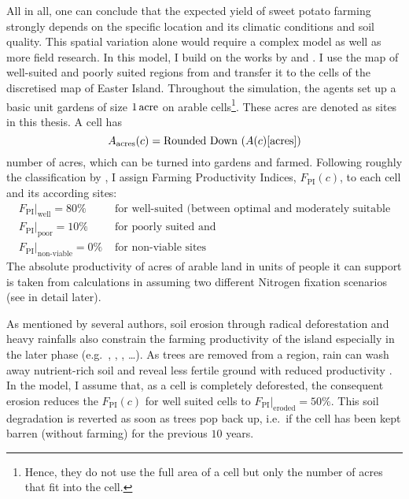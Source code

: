 All in all, one can conclude that the expected yield of sweet potato farming strongly depends on the specific location and its climatic conditions and soil quality.
This spatial variation alone would require a complex model as well as more field research.
In this model, I build on the works by \citep{Puleston2017} and \citet{Louwagie2006}.
I use the map of well-suited and poorly suited regions from \citet{Puleston2017} and transfer it to the cells of the discretised map of Easter Island.
Throughout the simulation, the agents set up a basic unit gardens of size $1\, {\rm acre}$ on arable cells\footnote{Hence, they do not use the full area of a cell but only the number of acres that fit into the cell.}.
These acres are denoted as sites in this thesis. 
A cell has 
\begin{equation}
A_{\rm acres}(c) = \text{Rounded Down }(A(c)[\text{acres}])
\end{equation}
number of acres, which can be turned into gardens and farmed.
Following roughly the classification by \citet{Louwagie2006}, I assign Farming Productivity Indices, $F_\text{PI}(c)$, to each cell and its according sites:
\begin{eqnarray*}
F_\text{PI}|_\text{well} = 80\% & \text{ for well-suited (between optimal and moderately suitable}\\
F_\text{PI}|_\text{poor} = 10\%  & \text{ for poorly suited and}\\ F_\text{PI}|_\text{non-viable} = 0\% & \text{ for non-viable sites}
\end{eqnarray*}
The absolute productivity of acres of arable land in units of people it can support is taken from calculations in \citet{Puleston2017} assuming two different Nitrogen fixation scenarios (see in detail later).

As mentioned by several authors, soil erosion through radical deforestation and heavy rainfalls also constrain the farming productivity of the island especially in the later phase (e.g.\ \citet{Brander1998}, \citet{Mieth2005}, \citet{Bahn2017}, \ldots).
As trees are removed from a region, rain can wash away nutrient-rich soil and reveal less fertile ground with reduced productivity \citet{Mieth2005}.
In the model, I assume that, as a cell is completely deforested, the consequent erosion reduces the $F_\text{PI}(c)$ for well suited cells to $F_\text{PI}|_\text{eroded}=50\%$. 
This soil degradation is reverted as soon as trees pop back up, i.e.\ if the cell has been kept barren (without farming) for the previous $10$ years.

